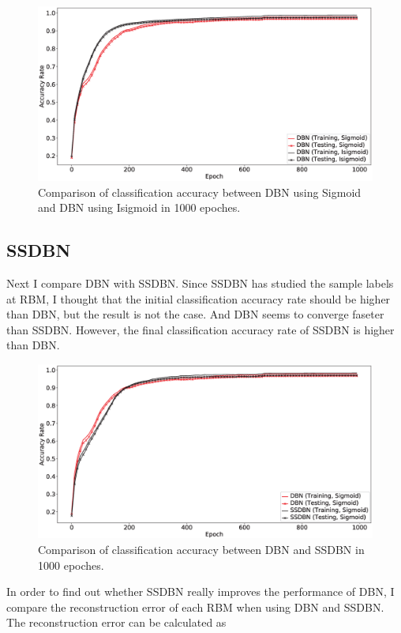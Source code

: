 \documentclass{bioinfo}
\begin{document}
\begin{figure}[htbp]
	\centering
	\includegraphics[width=\columnwidth]{SigmoidVSIsigmoid.eps}
	\caption{Comparison of classification accuracy between DBN using Sigmoid and DBN using Isigmoid in 1000 epoches.}
	\label{fig:SigmoidVSIsigmoid}
\end{figure}

\subsection{SSDBN}
Next I compare DBN with SSDBN. Since SSDBN has studied the sample labels at RBM, I thought that the initial classification accuracy rate should be higher than DBN, but the result is not the case. And DBN seems to converge faseter than SSDBN. However, the final classification accuracy rate of SSDBN is higher than DBN.

\begin{figure}[htbp]
	\centering
	\includegraphics[width=\columnwidth]{SSDBN.eps}
	\caption{Comparison of classification accuracy between DBN and SSDBN in 1000 epoches.}
	\label{fig:SSDBN}
\end{figure}

In order to find out whether SSDBN really improves the performance of DBN, I compare the reconstruction error of each RBM when using DBN and SSDBN. The reconstruction error can be calculated as 
\end{document}
